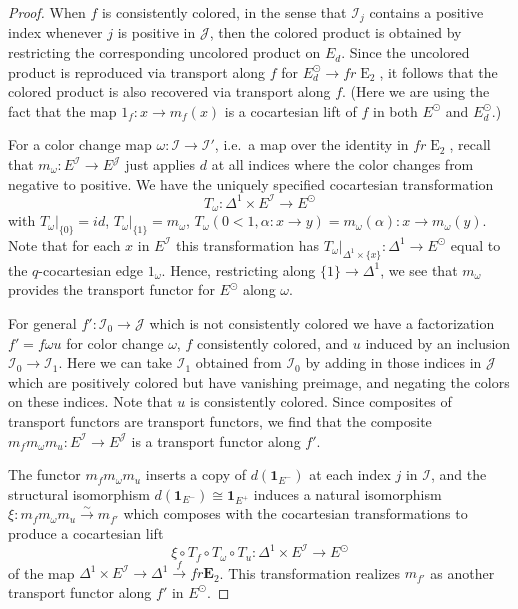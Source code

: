 \documentclass[reqno]{amsart}
\theoremstyle{definition}
\newcommand{\mcl}[1]{\mathcal{#1}}
\newcommand{\opn}[1]{\operatorname{#1}}
\newcommand{\E}{\mathbf{E}}
\renewcommand{\1}{\mathbf{1}}
\begin{document}
\begin{proof}
When $f$ is consistently colored, in the sense that $\mcl{I}_j$ contains a positive index whenever $j$ is positive in $\mcl{J}$, then the colored product is obtained by restricting the corresponding uncolored product on $E_d$.  Since the uncolored product is reproduced via transport along $f$ for $E_d^{\odot}\to fr\opn{E}_2$, it follows that the colored product is also recovered via transport along $f$.  (Here we are using the fact that the map $1_{f}:x\to m_f(x)$ is a cocartesian lift of $f$ in both $E^{\odot}$ and $E_d^{\odot}$.)
\par

For a color change map $\omega:\mcl{I}\to \mcl{I}'$, i.e.\ a map over the identity in $fr\opn{E}_2$, recall that $m_{\omega}:E^{\mcl{I}}\to E^{\mcl{J}}$ just applies $d$ at all indices where the color changes from negative to positive.  We have the uniquely specified cocartesian transformation
\[
T_{\omega}:\Delta^1\times E^{\mcl{I}}\to E^{\odot}
\]
with $T_{\omega}|_{\{0\}}=id$, $T_{\omega}|_{\{1\}}=m_{\omega}$, $T_{\omega}(0<1,\alpha:x\to y)=m_{\omega}(\alpha):x\to m_{\omega}(y)$.  Note that for each $x$ in $E^{\mcl{I}}$ this transformation has $T_{\omega}|_{\Delta^1\times\{x\}}:\Delta^1\to E^{\odot}$ equal to the $q$-cocartesian edge $1_{\omega}$.  Hence, restricting along $\{1\}\to \Delta^1$, we see that $m_{\omega}$ provides the transport functor for $E^{\odot}$ along $\omega$.
\par

For general $f':\mcl{I}_0\to \mcl{J}$ which is not consistently colored we have a factorization $f'=f\omega u$ for color change $\omega$, $f$ consistently colored, and $u$ induced by an inclusion $\mcl{I}_0\to \mcl{I}_1$.  Here we can take $\mcl{I}_1$ obtained from $\mcl{I}_0$ by adding in those indices in $\mcl{J}$ which are positively colored but have vanishing preimage, and negating the colors on these indices.  Note that $u$ is consistently colored.  Since composites of transport functors are transport functors, we find that the composite $m_fm_{\omega}m_u:E^{\mcl{I}}\to E^{\mcl{J}}$ is a transport functor along $f'$.
\par

The functor $m_fm_{\omega}m_u$ inserts a copy of $d(\1_{E^{-}})$ at each index $j$ in $\mcl{I}$, and the structural isomorphism $d(\1_{E^-})\cong \1_{E^+}$ induces a natural isomorphism $\xi:m_fm_{\omega}m_u\overset{\sim}\to m_{f'}$ which composes with the cocartesian transformations to produce a cocartesian lift
\[
\xi\circ T_f\circ T_{\omega}\circ T_u:\Delta^1\times E^{\mcl{I}}\to E^{\odot}
\]
of the map $\Delta^1\times E^{\mcl{I}}\to \Delta^1\overset{f}\to fr\E_2$. This transformation realizes $m_{f'}$ as another transport functor along $f'$ in $E^{\odot}$.
\end{proof}
\end{document}
